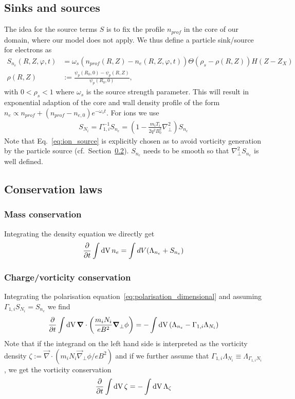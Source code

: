 \subsection{Sinks and sources} \label{sec:sources}
The idea for the source terms $S$ is to fix the profile $n_{prof}$ in the
core of our domain, where our model does not apply.
We thus define a particle sink/source for electrons as
\begin{align} \label{eq:electron_source}
  S_{n_e}(R,Z,\varphi, t) &= \omega_s
    (n_{prof}(R,Z) - n_e(R,Z,\varphi, t))\Theta( \rho_{s} -\rho(R,Z)) H(Z-Z_X)\\
    \rho(R,Z) &:= \frac{\psi_p(R_0,0)- \psi_p(R,Z) }{\psi_p(R_0,0)},
\end{align}
with $0 < \rho_{s}<1$
where $\omega_s$ is the source strength parameter.
This will result in exponential adaption of the core and wall
density profile of the form $n_e \propto n_{prof}+(n_{prof}-n_{e,0})e^{-\omega_st}$.
For ions we use
\begin{align}
    S_{N_i} = \Gamma_{1,i}^{-1} S_{n_e} = \left(1-\frac{m_i T_i}{2q^2 B_0^2} \nabla_\perp^2\right) S_{n_e}
  \label{eq:ion_source}
\end{align}
Note that Eq.~\eqref{eq:ion_source} is explicitly chosen as to avoid vorticity generation
by the particle source (cf.~Section~\ref{sec:conservation}). $S_{n_e}$ needs to be smooth
so that $\nabla_\perp^2 S_{n_e}$ is well defined.

\subsection{Conservation laws} \label{sec:conservation}
\subsubsection{Mass conservation}
Integrating the density equation we directly get
\begin{align} \label{eq:mass_conservation}
  \frac{\partial}{\partial t} \int \mathrm{dV}\, n_e =  \int dV (\Lambda_{n_e}+S_{n_e})
\end{align}
\subsubsection{Charge/vorticity conservation}
Integrating the polarisation equation~\eqref{eq:polarisation_dimensional}
and assuming $\Gamma_{1,i}S_{N_i} = S_{n_e}$ we find
\begin{align} \label{eq:charge_conservation}
  \frac{\partial}{\partial t} \int \mathrm{dV}\, {\boldsymbol{\nabla}} \cdot\left(\frac{m_iN_i}{e B^2} {\boldsymbol{\nabla}}_\perp \phi\right) =  - \int \mathrm{dV}\, (\Lambda_{n_e} - \Gamma_{1,i}\Lambda_{N_i})
\end{align}
Note that if the integrand on the left hand side is interpreted as the \ExB vorticity
density
$\zeta := \vec \nabla\cdot( m_iN_i\vec \nabla_\perp\phi/e B^2)$
and if we further assume that $\Gamma_{1,i} \Lambda_{N_i} \equiv \Lambda_{\Gamma_{1,i}N_i}$,
we get the vorticity conservation
\begin{align} \label{eq:vorticity_conservation}
  \frac{\partial}{\partial t} \int \mathrm{dV}\, \zeta =  - \int \mathrm{dV}\,\Lambda_{\zeta}
\end{align}


